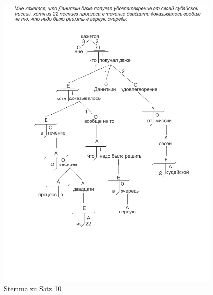 \begin{figure}
    \begin{center}
        \includegraphics{anhang_a/stemma10}
        \caption{Stemma zu Satz 10}
        \label{fig:stemma10}
    \end{center}
\end{figure}

